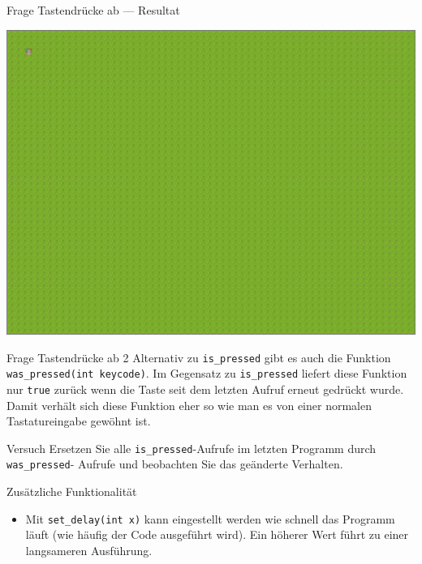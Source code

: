 \documentclass[presentation]{beamer}
\begin{document}
\begin{frame}[label={sec:org48d23b9}]{Frage Tastendrücke ab --- Resultat}
\begin{center}\begin{center}
\includegraphics[width=.9\linewidth]{data/d7/603d4d-1dca-45a9-8bea-d56ae35d3f81/screenshot-20170316-150157.png}
\end{center}\end{center}
\end{frame}
\begin{frame}[label={sec:org6ca726b},fragile]{Frage Tastendrücke ab 2}
 Alternativ zu {\color{solarizedYellow}\texttt{is\_pressed} }gibt es auch die Funktion {\color{solarizedYellow}\texttt{was\_pressed(int
keycode)}}. Im Gegensatz zu {\color{solarizedYellow}\texttt{is\_pressed} }liefert diese Funktion nur
{\color{solarizedYellow}\texttt{true} }zurück wenn die Taste seit dem letzten Aufruf erneut gedrückt
wurde. Damit verhält sich diese Funktion eher so wie man es von einer
normalen Tastatureingabe gewöhnt ist.
\begin{block}{Versuch}
Ersetzen Sie alle {\color{solarizedYellow}\texttt{is\_pressed}}-Aufrufe im letzten Programm durch
{\color{solarizedYellow}\texttt{was\_pressed}}- Aufrufe und beobachten Sie das geänderte Verhalten.
\end{block}
\end{frame}
\begin{frame}[label={sec:org89f1ffa},fragile]{Zusätzliche Funktionalität}
 \begin{itemize}
\item Mit {\color{solarizedYellow}\texttt{set\_delay(int x)} }kann eingestellt werden wie schnell das
Programm läuft (wie häufig der Code ausgeführt wird). Ein höherer
Wert führt zu einer langsameren Ausführung.
\end{itemize}
\end{frame}
\end{document}
